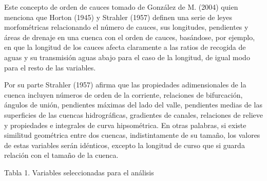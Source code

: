 \documentclass[11pt,]{article}
\begin{document}
Este concepto de orden de cauces tomado de González de M. (2004) quien
menciona que Horton (1945) y Strahler (1957) definen una serie de leyes
morfométricas relacionando el número de cauces, sus longitudes,
pendientes y áreas de drenaje en una cuenca con el orden de cauces,
basándose, por ejemplo, en que la longitud de los cauces afecta
claramente a las ratios de recogida de aguas y su transmisión aguas
abajo para el caso de la longitud, de igual modo para el resto de las
variables.

Por su parte Strahler (1957) afirma que las propiedades adimensionales
de la cuenca incluyen números de orden de la corriente, relaciones de
bifurcación, ángulos de unión, pendientes máximas del lado del valle,
pendientes medias de las superficies de las cuencas hidrográficas,
gradientes de canales, relaciones de relieve y propiedades e integrales
de curva hipsométrica. En otras palabras, si existe similitud geométrica
entre dos cuencas, indistintamente de su tamaño, los valores de estas
variables serán idénticos, excepto la longitud de curso que si guarda
relación con el tamaño de la cuenca.

Tabla 1. Variables seleccionadas para el análisis
\end{document}
